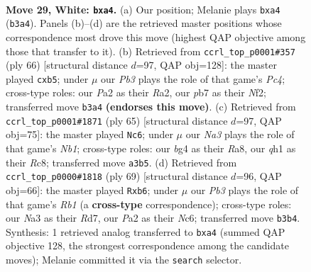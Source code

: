 \documentclass[11pt]{article}
\begin{document}
\clearpage

\begin{figure}[p]\centering
\begin{subfigure}{0.46\textwidth}\centering
\resizebox{\linewidth}{!}{%
\newchessgame
\chessboard[
  setfen={r3r3/1pp3kp/5p2/3p2b1/p5b1/NPBKP3/P4P2/RN5q w - - 0 29},
  showmover=false,
  pgfstyle=straightmove, color=movearrow, markmove={b3-a4}
]}
\caption{}
\end{subfigure}\hfill
\begin{subfigure}{0.46\textwidth}\centering
\resizebox{\linewidth}{!}{%
\newchessgame
\chessboard[
  setfen={2b1r1k1/7r/p2p4/1ppPbp2/P1P4P/3B2P1/R4NK1/7R w - - 0 34},
  showmover=false,
  pgfstyle=straightmove, color=movearrow, markmove={c4-b5}
]}
\caption{}
\end{subfigure}
\\[4pt]
\begin{subfigure}{0.46\textwidth}\centering
\resizebox{\linewidth}{!}{%
\newchessgame
\chessboard[
  setfen={rnr2b2/3p2p1/1B2p1k1/2P1P2p/p1R3P1/P2R4/3N2KP/8 b - - 0 33},
  showmover=false,
  pgfstyle=straightmove, color=movearrow, markmove={b8-c6}
]}
\caption{}
\end{subfigure}\hfill
\begin{subfigure}{0.46\textwidth}\centering
\resizebox{\linewidth}{!}{%
\newchessgame
\chessboard[
  setfen={1r6/2pr1k2/pPnp1bp1/7p/2P4P/RP2PPK1/2N5/2BR4 b - - 0 35},
  showmover=false,
  pgfstyle=straightmove, color=movearrow, markmove={b8-b6}
]}
\caption{}
\end{subfigure}
\caption{\textbf{Move 29, White: \texttt{bxa4}.} (a) Our position; Melanie plays \texttt{bxa4} (\texttt{b3a4}). Panels (b)--(d) are the retrieved master positions whose correspondence most drove this move (highest QAP objective among those that transfer to it). (b) Retrieved from \texttt{ccrl\_top\_p0001\#357} (ply 66) [structural distance $d$=97, QAP obj=128]: the master played \texttt{cxb5}; under $\mu$ our \emph{Pb3} plays the role of that game's \emph{Pc4}; cross-type roles: our \emph{P}a2 as their \emph{R}a2, our \emph{p}b7 as their \emph{N}f2; transferred move \texttt{b3a4} \textbf{(endorses this move)}. (c) Retrieved from \texttt{ccrl\_top\_p0001\#1871} (ply 65) [structural distance $d$=97, QAP obj=75]: the master played \texttt{Nc6}; under $\mu$ our \emph{Na3} plays the role of that game's \emph{Nb1}; cross-type roles: our \emph{b}g4 as their \emph{R}a8, our \emph{q}h1 as their \emph{R}c8; transferred move \texttt{a3b5}. (d) Retrieved from \texttt{ccrl\_top\_p0000\#1818} (ply 69) [structural distance $d$=96, QAP obj=66]: the master played \texttt{Rxb6}; under $\mu$ our \emph{Pb3} plays the role of that game's \emph{Rb1} (a \textbf{cross-type} correspondence); cross-type roles: our \emph{N}a3 as their \emph{R}d7, our \emph{P}a2 as their \emph{N}c6; transferred move \texttt{b3b4}. Synthesis: 1 retrieved analog transferred to \texttt{bxa4} (summed QAP objective 128, the strongest correspondence among the candidate moves); Melanie committed it via the \texttt{search} selector.}
\label{fig:thought-m56}
\end{figure}
\end{document}
